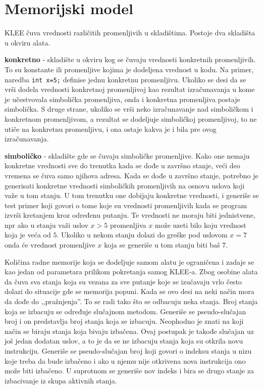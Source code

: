 \documentclass[12pt,oneside]{memoir}
\begin{document}
\section{Memorijski model} \label{memorija}
KLEE čuva vrednosti različitih promenljivih u skladištima. Postoje dva skladišta u okviru alata. 
\begin{description}
    \item \textbf{konkretno} - skladište u okviru kog se čuvaju vrednosti konkretnih promenljivih. To su konstante ili promenljive kojima je dodeljena vrednost u kodu. Na primer, naredba \texttt{int x=5;} definise jednu konkretnu promenljivu. Ukoliko se desi da se vrši dodela vrednosti konkretnoj promenljivoj kao rezultat izračunavanja u kome je učestvovala simbolička promenljiva, onda i konkretna promenljiva postaje simbolička. S druge strane, ukoliko se vrši neko izračunavanje nad simboličkom i konkretnom promenljivom, a rezultat se dodeljuje simboličkoj promenljivoj, to ne utiče na konkretnu promenljivu, i ona ostaje kakva je i bila pre ovog izračunavanja.
    
    \item \textbf{simboličko} - skladište gde se čuvaju simboličke promenljive. Kako one nemaju konkretne vrednosti sve do trenutka kada se dođe u završno stanje, veći deo vremena se čuva samo njihova adresa. Kada se dođe u završno stanje, potrebno je generisati konkretne vrednosti simboličkih promenljivih na osnovu uslova koji važe u tom stanju. U tom trenutku one dobijaju konkretne vrednosti, i generiše se test primer koji govori o tome koje su vrednosti promenljivih kada se program izvrši kretanjem kroz određenu putanju. Te vrednosti ne moraju biti jednistvene, npr ako u stanju važi uslov $x > 5$ promenljiva $x$ može uzeti bilo koju vrednost koja je veća od $5$. Ukoliko u nekom stanju dolazi do greške pod uslovom $x = 7$ onda će vrednost promenljive $x$ koja se generiše u tom stanju biti baš $7$.
\end{description}
\bigskip
Količina radne memorije koja se dodeljuje samom alatu je ograničena i zadaje se kao jedan od parametara prilikom pokretanja samog KLEE-a. Zbog osobine alata da čuva sva stanja koja su vezana za sve putanje koje se izučavaju vrlo često dolazi do situacije gde se memorija popuni. Kada se ovo desi na neki način mora da dođe do ,,pražnjenja''. To se radi tako što se odbacuju neka stanja. Broj stanja koja se izbacuju se određuje slučajnom metodom. Generiše se pseudo-slučajan broj i on predstavlja broj stanja koja se izbacuju. Neophodno je znati na koji način se biraju stanja koja bivaju izbačena. Ovaj postupak je takođe slučajan uz još jedan dodatan uslov, a to je da se ne izbacuju stanja koja su otkrila novu instrukciju. Generiše se pseudo-slučajan broj koji govori o indeksu stanja u nizu koje treba da bude izbačeno i ako u njemu nije otkrivena nova instrukcija ono može biti izbačeno. U suprotnom se generiše nov indeks i bira se drugo stanje za izbacivanje iz skupa aktivnih stanja.
\end{document}
